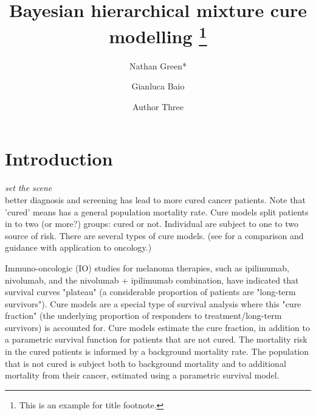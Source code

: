 \documentclass[AMA,STIX1COL]{WileyNJD-v2}
\begin{document}
\title{Bayesian hierarchical mixture cure modelling \protect\thanks{This is an example for title footnote.}}

\author[1]{Nathan Green*}

\author[2,3]{Gianluca Baio}

\author[3]{Author Three}


\address[1]{, , }

\address[2]{, , }

\address[3]{, , }


\presentaddress{}




\maketitle



\section{Introduction}\label{sec:intro}

{\it set the scene}\\
better diagnosis and screening has lead to more cured cancer patients.
Note that 'cured' means has a general population mortality rate.
Cure models split patients in to two (or more?) groups: cured or not.
Individual are subject to one to two source of risk.
There are several types of cure models.
(see \cite{Yu2013} for a comparison and guidance with application to oncology.)


Immuno-oncologic (IO) studies for melanoma therapies, such as ipilimumab, nivolumab, and the nivolumab + ipilimumab combination, have indicated that survival curves "plateau" (a considerable proportion of patients are "long-term survivors"). Cure models are a special type of survival analysis where this "cure fraction" (the underlying proportion of responders to treatment/long-term survivors) is accounted for. Cure models estimate the cure fraction, in addition to a parametric survival function for patients that are not cured. The mortality risk in the cured patients is informed by a background mortality rate. The population that is not cured is subject both to background mortality and to additional mortality from their cancer, estimated using a parametric survival model.
\cite{Amico2018}
\end{document}
